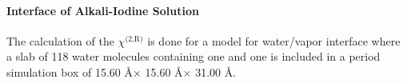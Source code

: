 \paragraph{Interface of Alkali-Iodine Solution}
The calculation of the $\chi^\text{(2,R)}$ is done for a model for water/vapor interface where a slab of 118 
water molecules containing one \Li and one \I is included in a period simulation box of 15.60 \AA $\times$ 15.60 \AA $\times$ 31.00 \AA.

